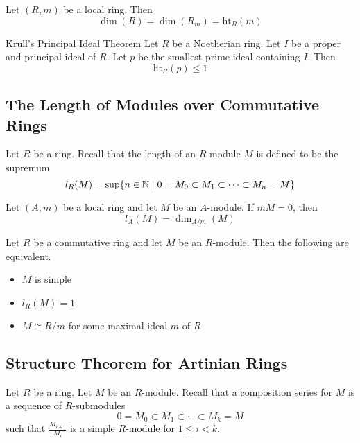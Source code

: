 \documentclass[a4paper]{article}
\begin{document}
\begin{crl}{}{} Let $(R,m)$ be a local ring. Then $$\dim(R)=\dim(R_m)=\text{ht}_R(m)$$
\end{crl}

\begin{thm}{Krull's Principal Ideal Theorem}{} Let $R$ be a Noetherian ring. Let $I$ be a proper and principal ideal of $R$. Let $p$ be the smallest prime ideal containing $I$. Then $$\text{ht}_R(p)\leq 1$$
\end{thm}

\subsection{The Length of Modules over Commutative Rings}
Let $R$ be a ring. Recall that the length of an $R$-module $M$ is defined to be the supremum $$l_R(M)=\text{sup}\{n\in\mathbb{N}\;|\;0=M_0\subset M_1\subset\cdots\subset M_n=M\}$$

\begin{lmm}{}{} Let $(A,m)$ be a local ring and let $M$ be an $A$-module. If $mM=0$, then $$l_A(M)=\dim_{A/m}(M)$$
\end{lmm}

\begin{prp}{}{} Let $R$ be a commutative ring and let $M$ be an $R$-module. Then the following are equivalent. 
\begin{itemize}
\item $M$ is simple
\item $l_R(M)=1$
\item $M\cong R/m$ for some maximal ideal $m$ of $R$
\end{itemize}
\end{prp}

\subsection{Structure Theorem for Artinian Rings}
Let $R$ be a ring. Let $M$ be an $R$-module. Recall that a composition series for $M$ is a sequence of $R$-submodules $$0=M_0\subset M_1\subset\cdots\subset M_k=M$$ such that $\frac{M_{i+1}}{M_i}$ is a simple $R$-module for $1\leq i<k$. 
\end{document}
